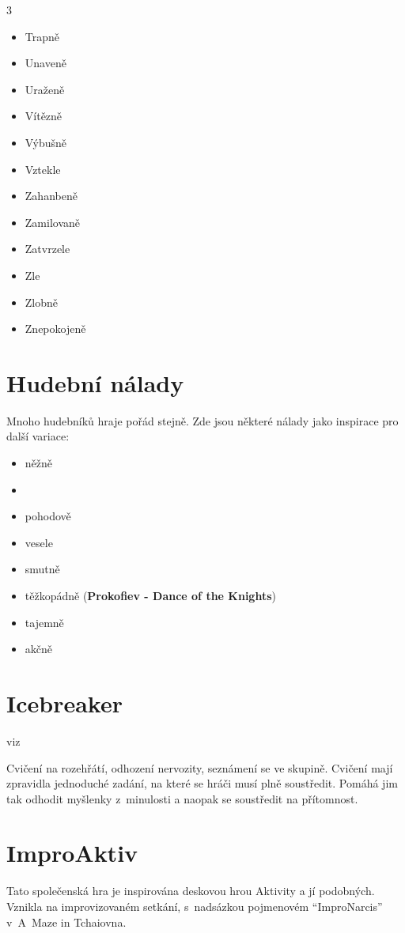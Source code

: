 \begin{multicols}{3}
\begin{itemize}
\item  Trapně
\item  Unaveně
\item  Uraženě
\item  Vítězně
\item  Výbušně
\item  Vztekle
\item  Zahanbeně
\item  Zamilovaně
\item  Zatvrzele
\item  Zle
\item  Zlobně
\item  Znepokojeně
\end{itemize}
\end{multicols} 
 
\needspace{5cm} \section{Hudební nálady} \label{hudební nálady} Mnoho hudebníků hraje pořád stejně. Zde jsou některé nálady jako inspirace pro další variace: 
\begin{itemize}
\item něžně
\item {}  
\item pohodově
\item vesele
\item smutně
\item těžkopádně (\textbf{Prokofiev - Dance of the Knights})
\item tajemně 
\item akčně
\end{itemize}
\needspace{5cm} \section{Icebreaker} \label{icebreaker} viz  
 
Cvičení na rozehřátí, odhození nervozity, seznámení se ve skupině. Cvičení mají zpravidla jednoduché zadání, na které se hráči musí plně soustředit. Pomáhá jim tak odhodit myšlenky z~minulosti a naopak se soustředit na přítomnost. 
\needspace{5cm} \section{ImproAktiv} \label{improaktiv} Tato společenská hra je inspirována deskovou hrou Aktivity a jí podobných. Vznikla na improvizovaném setkání, s~nadsázkou pojmenovém “ImproNarcis” v~A~Maze in Tchaiovna. 
 
